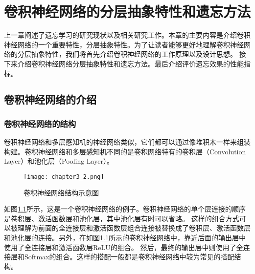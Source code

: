 
\chapter{卷积神经网络的分层抽象特性和遗忘方法}
上一章阐述了遗忘学习的研究现状以及相关研究工作。本章的主要内容是介绍卷积神经网络的一个重要特性，分层抽象特性。为了让读者能够更好地理解卷积神经网络的分层抽象特性，我们将首先介绍卷积神经网络的工作原理以及设计思想。
接下来介绍卷积神经网络分层抽象特性和遗忘方法。最后介绍评价遗忘效果的性能指标。

\section{卷积神经网络的介绍}

\subsection{卷积神经网络的结构}

卷积神经网络和多层感知机的神经网络类似，它们都可以通过像堆积木一样来组装构建。卷积神经网络和多层感知机不同的是卷积网络特有的卷积层（Convolution Layer）和池化层（Pooling Layer）。

\begin{figure}
    \centering
    \texttt{[image: chapter3\_2.png]}
    \caption{卷积神经网络结构示意图\cite{luyujie_216}}
    \label{fig:chapter3_2}
\end{figure}

如图\ref{fig:chapter3_2}所示，这是一个卷积神经网络的例子。卷积神经网络的单个层连接的顺序是卷积层、激活函数层和池化层，其中池化层有时可以省略。
这样的组合方式可以被理解为前面的全连接层和激活函数层组合连接被替换成了卷积层、激活函数层和池化层的连接。另外，在如图\ref{fig:chapter3_2}所示的卷积神经网络中，靠近后面的输出层中使用了全连接层和激活函数层ReLU的组合。
然后，最终的输出层中则使用了全连接层和Softmax的组合。这样的搭配一般都是卷积神经网络中较为常见的搭配结构。

